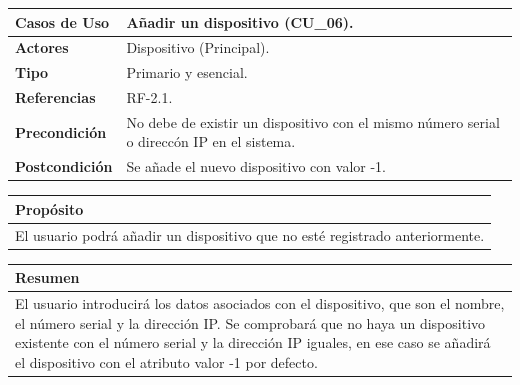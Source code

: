 \begin{itemize}
    \begin{table}[h!]
        \centering
        \begin{tabular}{|l|p{}|}
            \hline
            \textbf{Casos de Uso}   &   Añadir un dispositivo (CU\_06). \\
            \hline 
            \textbf{Actores}        &   Dispositivo (Principal). \\ 
            \hline 
            \textbf{Tipo}           &   Primario y esencial. \\ 
            \hline
            \textbf{Referencias}    &   RF-2.1. \\ 
            \hline
            \textbf{Precondición}   &   No debe de existir un dispositivo con el mismo número serial o direccón IP en el 
            sistema. \\ 
            \hline
            \textbf{Postcondición}  &   Se añade el nuevo dispositivo con valor -1. \\ 
            \hline
        \end{tabular}
        
        \vspace{5mm}
        
        \begin{tabular}{|p{\textwidth}|}
            \hline
            \rowcolor{SeaGreen} \textbf{Propósito} \\
            \hline
            \multicolumn{1}{|p{12cm}|}{El usuario podrá añadir un dispositivo que no esté registrado anteriormente.} \\ [0.5ex]
            \hline
        \end{tabular}
        
        \vspace{5mm}
        
        \begin{tabular}{|p{\textwidth}|}
            \hline
            \rowcolor{SeaGreen} \textbf{Resumen} \\
            \hline
            \multicolumn{1}{|p{12cm}|}{El usuario introducirá los datos asociados con el dispositivo, que son el nombre, 
            el número serial y la dirección IP. Se comprobará que no haya un dispositivo existente con el número serial y 
            la dirección IP iguales, en ese caso se añadirá el dispositivo con el atributo valor -1 por defecto.} \\ [0.5ex]
            \hline
        \end{tabular}
        

\end{table}
\end{itemize}
